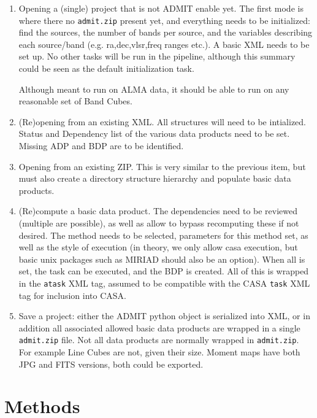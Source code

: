 \documentclass{article}
\begin{document}
\begin{enumerate}

\item
Opening a (single) project that is not ADMIT enable yet.
The first mode is where there no {\tt admit.zip} 
present yet, and everything needs to be initialized: find
the sources, the number of bands per source, and the variables
describing each source/band (e.g. ra,dec,vlsr,freq ranges etc.). A
basic XML needs to be set up.  No other tasks will be run in the
pipeline, although this summary could be seen as the default
initialization task.

Although meant to run on ALMA data, it should be able to run on
any reasonable set of Band Cubes.


\item
(Re)opening from an existing XML.  All structures will need to be 
intialized. Status and Dependency list of the various data products
need to be set. Missing ADP and BDP are to be identified.

\item
Opening from an existing ZIP. This is very similar to the previous
item, but must also create a directory structure hierarchy and 
populate basic data products.

\item
(Re)compute a basic data product. The dependencies need to be reviewed
(multiple are possible), as well as allow to bypass recomputing these
if not desired.  The method needs to be selected, parameters for this
method set, as well as the style of execution (in theory, we only
allow casa execution, but basic unix packages such as MIRIAD should 
also be an option).  When all is set, the task can be executed, and the
BDP is created. All of this is wrapped in the {\tt atask} XML tag,
assumed to be compatible with the CASA {\tt task} XML tag for
inclusion into CASA.

\item
Save a project:  either the ADMIT python object is serialized into XML, 
or in addition all associated allowed basic data products 
are wrapped in a single {\tt admit.zip} file. Not all data products
are normally wrapped in {\tt admit.zip}. For example Line Cubes are not, given
their size. Moment maps have both JPG and FITS versions, both could be
exported.

\end{enumerate}

\section{Methods}
\end{document}

